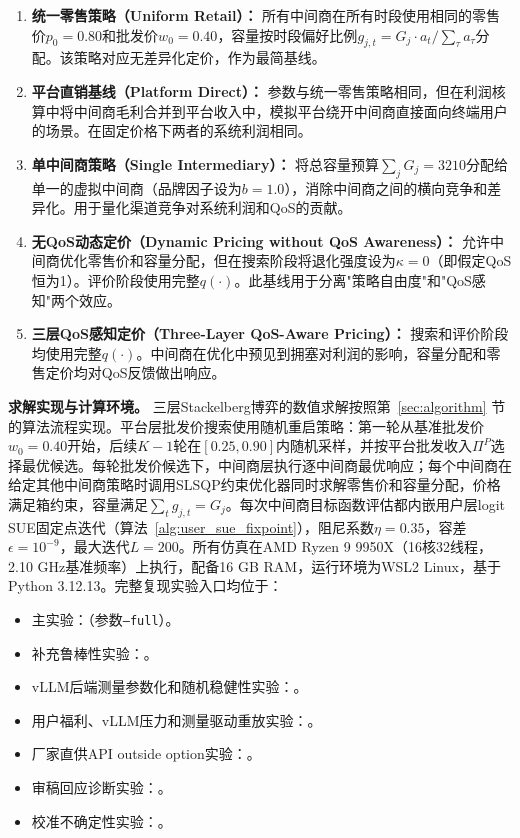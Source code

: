 \documentclass[UTF8,11pt]{ctexart}
\newcommand{\qos}{q}
\begin{document}
\begin{enumerate}[leftmargin=2em]
  \item \textbf{统一零售策略（Uniform Retail）：} 所有中间商在所有时段使用相同的零售价$p_0=0.80$和批发价$w_0=0.40$，容量按时段偏好比例$g_{j,t}=G_j\cdot a_t/\sum_\tau a_\tau$分配。该策略对应无差异化定价，作为最简基线。
  \item \textbf{平台直销基线（Platform Direct）：} 参数与统一零售策略相同，但在利润核算中将中间商毛利合并到平台收入中，模拟平台绕开中间商直接面向终端用户的场景。在固定价格下两者的系统利润相同。
  \item \textbf{单中间商策略（Single Intermediary）：} 将总容量预算$\sum_j G_j=3210$分配给单一的虚拟中间商（品牌因子设为$b=1.0$），消除中间商之间的横向竞争和差异化。用于量化渠道竞争对系统利润和QoS的贡献。
  \item \textbf{无QoS动态定价（Dynamic Pricing without QoS Awareness）：} 允许中间商优化零售价和容量分配，但在搜索阶段将退化强度设为$\kappa=0$（即假定QoS恒为1）。评价阶段使用完整$\qos(\cdot)$。此基线用于分离"策略自由度"和"QoS感知"两个效应。
  \item \textbf{三层QoS感知定价（Three-Layer QoS-Aware Pricing）：} 搜索和评价阶段均使用完整$\qos(\cdot)$。中间商在优化中预见到拥塞对利润的影响，容量分配和零售定价均对QoS反馈做出响应。
\end{enumerate}

\textbf{求解实现与计算环境。} 三层Stackelberg博弈的数值求解按照第~\ref{sec:algorithm} 节的算法流程实现。平台层批发价搜索使用随机重启策略：第一轮从基准批发价$w_0=0.40$开始，后续$K-1$轮在$[0.25,0.90]$内随机采样，并按平台批发收入$\Pi^P$选择最优候选。每轮批发价候选下，中间商层执行逐中间商最优响应；每个中间商在给定其他中间商策略时调用SLSQP约束优化器同时求解零售价和容量分配，价格满足箱约束，容量满足$\sum_t g_{j,t}=G_j$。每次中间商目标函数评估都内嵌用户层logit SUE固定点迭代（算法~\ref{alg:user_sue_fixpoint}），阻尼系数$\eta=0.35$，容差$\epsilon=10^{-9}$，最大迭代$L=200$。所有仿真在AMD Ryzen 9 9950X（16核32线程，2.10 GHz基准频率）上执行，配备16 GB RAM，运行环境为WSL2 Linux，基于Python 3.12.13。完整复现实验入口均位于：
\begin{itemize}[leftmargin=2em]
  \item 主实验：（参数\texttt{--full}）。
  \item 补充鲁棒性实验：。
  \item vLLM后端测量参数化和随机稳健性实验：。
  \item 用户福利、vLLM压力和测量驱动重放实验：。
  \item 厂家直供API outside option实验：。
  \item 审稿回应诊断实验：。
  \item 校准不确定性实验：。
\end{itemize}
\end{document}
